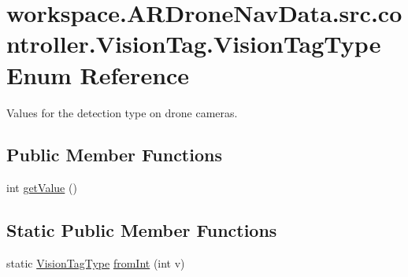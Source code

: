 \hypertarget{enumworkspace_1_1_a_r_drone_nav_data_1_1src_1_1controller_1_1_vision_tag_1_1_vision_tag_type}{}\section{workspace.\+A\+R\+Drone\+Nav\+Data.\+src.\+controller.\+Vision\+Tag.\+Vision\+Tag\+Type Enum Reference}
\label{enumworkspace_1_1_a_r_drone_nav_data_1_1src_1_1controller_1_1_vision_tag_1_1_vision_tag_type}


Values for the detection type on drone cameras.  


\subsection*{Public Member Functions}
\begin{DoxyCompactItemize}
\item 
int \hyperlink{enumworkspace_1_1_a_r_drone_nav_data_1_1src_1_1controller_1_1_vision_tag_1_1_vision_tag_type_ac3061c701071f4218f57e6fa54b65482}{get\+Value} ()
\end{DoxyCompactItemize}
\subsection*{Static Public Member Functions}
\begin{DoxyCompactItemize}
\item 
static \hyperlink{enumworkspace_1_1_a_r_drone_nav_data_1_1src_1_1controller_1_1_vision_tag_1_1_vision_tag_type}{Vision\+Tag\+Type} \hyperlink{enumworkspace_1_1_a_r_drone_nav_data_1_1src_1_1controller_1_1_vision_tag_1_1_vision_tag_type_aa89559232be30c617a99c38963177232}{from\+Int} (int v)
\end{DoxyCompactItemize}
